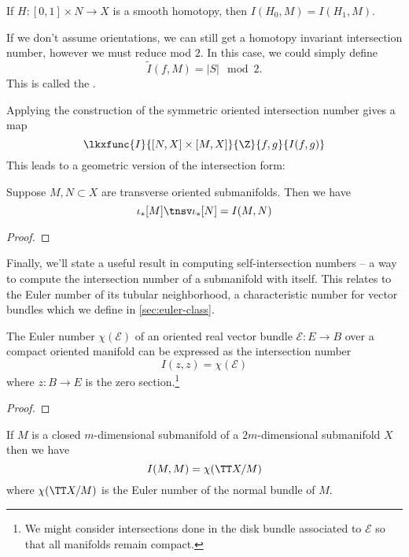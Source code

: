 \begin{corollary}
	If $H : [0,1]\times N \to X$ is a smooth homotopy, then $I(H_0, M) = I(H_1, M)$.
\end{corollary}

\begin{remark}
	If we don't assume orientations, we can still get a homotopy invariant intersection number, however we must reduce mod $2$. In this case, we could simply define
	\[
		\widetilde{I}(f,M) = |S|\mod 2.
	\]
	This is called the .
\end{remark}

Applying the construction of the symmetric oriented intersection number gives a map
\begin{equation}\label{eq:oriented-intersection-number-homotopy}
	\lkxfunc{I}{[N,X]\times [M,X]}{\Z}{f,g}{I(f,g)}
\end{equation}
This leads to a geometric version of the intersection form: 

\begin{theorem}
	Suppose $M,N\subset X$ are transverse oriented submanifolds. Then we have
	\[\iota_*[M]\tnsv \iota_*[N] = I(M,N)\]
\end{theorem}
\begin{proof}
\end{proof}


Finally, we'll state a useful result in computing self-intersection numbers -- a way to compute the intersection number of a submanifold with itself. This relates to the Euler number of its tubular neighborhood, a characteristic number for vector bundles which we define in \cref{sec:euler-class}.

\begin{theorem}\label{thm:euler-number-self-intersection-corollary}
	The Euler number $\chi(\mathcal{E})$ of an oriented real vector bundle $\mathcal{E} : E \to B$ over a compact oriented manifold can be expressed as the intersection number
	\[
		I(z,z) = \chi(\mathcal{E})
	\]
	where $z : B \to E$ is the zero section.\footnote{We might consider intersections done in the disk bundle associated to $\mathcal{E}$ so that all manifolds remain compact.}
\end{theorem}
\begin{proof}
\end{proof}

\begin{corollary}\label{thm:euler-number-self-intersection}
	If $M$ is a closed $m$-dimensional submanifold of a $2m$-dimensional submanifold $X$ then we have
	\[
		I(M, M) = \chi(\TT X/M)
	\]
	where $\chi(\TT X/M)$ is the Euler number of the normal bundle of $M$.
\end{corollary}


